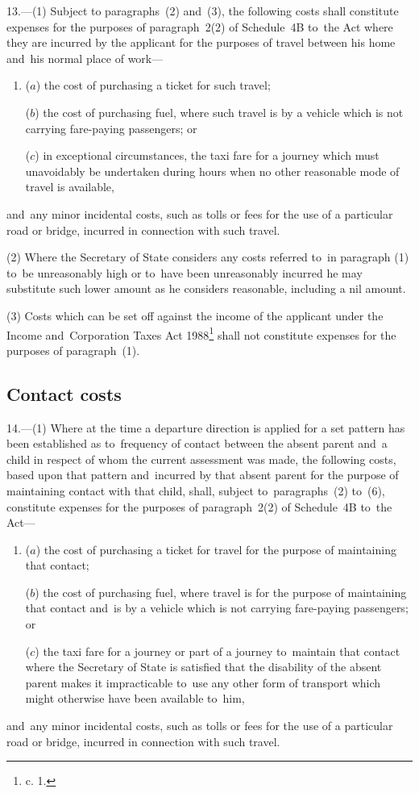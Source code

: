 \documentclass[12pt,a4paper]{article}
\begin{document}
13.—(1) Subject to
paragraphs~(2) and~(3), the following costs shall constitute expenses for the
purposes of paragraph~2(2) of Schedule~4B to~the Act where they are incurred by
the applicant for the purposes of travel between his home and~his normal place
of work—
\begin{enumerate}\item[]
($a$) the cost of purchasing a ticket for such travel;

($b$) the cost of purchasing fuel, where such travel is by a vehicle which is not
carrying fare-paying passengers; or

($c$) in exceptional circumstances, the taxi fare for a journey which must
unavoidably be undertaken during hours when no other reasonable mode of travel
is available,
\end{enumerate}
and~any minor incidental costs, such as tolls or fees for the use of a
particular road or bridge, incurred in connection with such travel.

(2) Where the Secretary of State considers any costs referred to~in paragraph
(1) to~be unreasonably high or to~have been unreasonably incurred he may
substitute such lower amount as he considers reasonable, including a nil amount.

(3) Costs which can be set off against the income of the applicant under the
Income and~Corporation Taxes Act 1988\footnote{ c. 1.} shall not constitute expenses for the
purposes of paragraph~(1).

\subsection[14. Contact costs]{Contact costs}

14.—(1) Where at the time a departure direction is applied for a
set pattern has been established as to~frequency of contact between the absent
parent and~a child in respect of whom the current assessment was made, the
following costs, based upon that pattern and~incurred by that absent parent for
the purpose of maintaining contact with that child, shall, subject to~paragraphs~(2) to~(6), constitute expenses for the purposes of paragraph~2(2) of Schedule~4B to~the Act—
\begin{enumerate}\item[]
($a$) the cost of purchasing a ticket for travel for the purpose of maintaining
that contact;

($b$) the cost of purchasing fuel, where travel is for the purpose of maintaining
that contact and~is by a vehicle which is not carrying fare-paying passengers;
or

($c$) the taxi fare for a journey or part of a journey to~maintain that contact
where the Secretary of State is satisfied that the disability of the absent
parent makes it impracticable to~use any other form of transport which might
otherwise have been available to~him,
\end{enumerate}
and~any minor incidental costs, such as tolls or fees for the use of a
particular road or bridge, incurred in connection with such travel.
\end{document}
